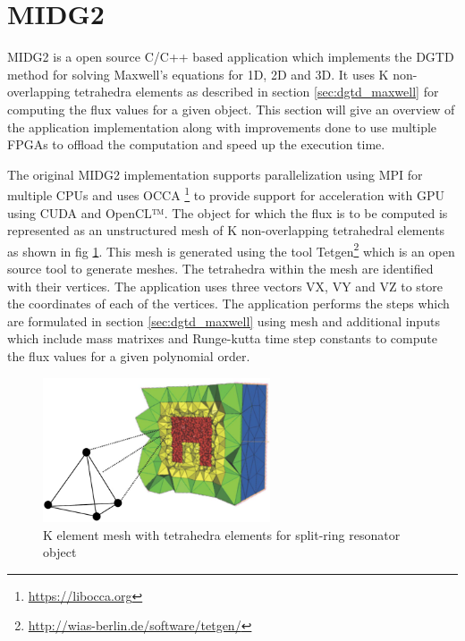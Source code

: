 \section{\acf{MIDG2}}

\ac{MIDG2} is a open source C/C++ based application which implements the \ac{DGTD} method for solving
Maxwell's equations for 1D, 2D and 3D. It uses K non-overlapping tetrahedra elements as described in
section \ref{sec:dgtd_maxwell} for computing the flux values for a given object. This section
will give an overview of the application implementation along with improvements done to use
multiple FPGAs to offload the computation and speed up the execution time.

The original MIDG2 implementation supports parallelization using \ac{MPI} for multiple CPUs and
uses OCCA \footnote{\url{https://libocca.org}} to provide support for acceleration with GPU
using CUDA and OpenCL™. The object for which the flux is to be computed is represented as
an unstructured mesh of K non-overlapping tetrahedral elements as shown in fig \ref{fig:mesh}.
This mesh is generated using the tool Tetgen\footnote{\url{http://wias-berlin.de/software/tetgen/}}
which is an open source tool to generate meshes. The tetrahedra within the mesh are
identified with their vertices. The application uses three vectors VX, VY and VZ
to store the coordinates of each of the vertices. The application performs the steps
which are formulated in section \ref{sec:dgtd_maxwell} using mesh and additional
inputs which include mass matrixes and Runge-kutta time step constants to compute the
flux values for a given polynomial order.
\begin{figure}[h]%
    \centering
    \includegraphics[width=0.6\textwidth]{images/mesh}
    \caption{K element mesh with tetrahedra elements for split-ring resonator object}
    \label{fig:mesh}
\end{figure}


